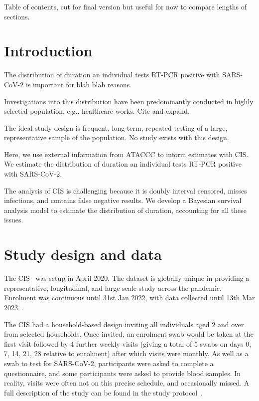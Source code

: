 \documentclass[12pt, letterpaper]{article} %
\makeatletter
\DeclareRobustCommand\onedot{\futurelet\@let@token\@onedot}
\def\@onedot{\ifx\@let@token.\else.\null\fi\xspace}
\def\eg{e.g\onedot} \def\Eg{\emph{E.g}\onedot}
\makeatother
\begin{document}
Table of contents, cut for final version but useful for now to compare lengths of sections.

\tableofcontents

\newpage
{} %

\section{Introduction}


The distribution of duration an individual tests RT-PCR positive with SARS-CoV-2 is important for blah blah reasons.

Investigations into this distribution have been predominantly conducted in highly selected population, \eg healthcare works.
Cite and expand.

The ideal study design is frequent, long-term, repeated testing of a large, representative sample of the population.
No study exists with this design.

Here, we use external information from ATACCC to inform estimates with CIS.
We estimate the distribution of duration an individual tests RT-PCR positive with SARS-CoV-2.

The analysis of CIS is challenging because it is doubly interval censored, misses infections, and contains false negative results.
We develop a Bayesian survival analysis model to estimate the distribution of duration, accounting for all these issues.

\section{Study design and data}

The CIS~\autocite{CIS} was setup in April 2020.
The dataset is globally unique in providing a representative, longitudinal, and large-scale study across the pandemic.
Enrolment was continuous until 31st Jan 2022, with data collected until 13th Mar 2023~\autocite{weiRisk}. 

The CIS had a household-based design inviting all individuals aged 2 and over from selected households.
Once invited, an enrolment swab would be taken at the first visit followed by 4 further weekly visits (giving a total of 5 swabs on days 0, 7, 14, 21, 28 relative to enrolment) after which visits were monthly.
As well as a swab to test for SARS-CoV-2, participants were asked to complete a questionnaire, and some participants were asked to provide blood samples.
In reality, visits were often not on this precise schedule, and occasionally missed.
A full description of the study can be found in the study protocol~\autocite{cisProtocol}.
\end{document}
